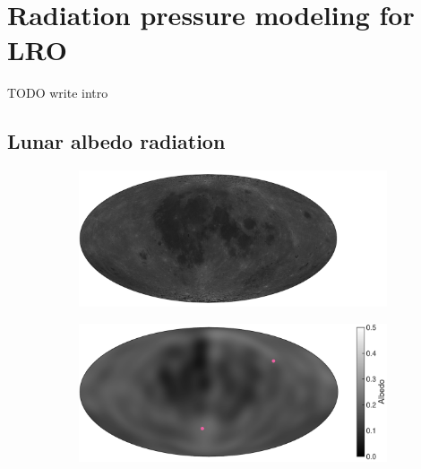 \section{Radiation pressure modeling for LRO}

TODO write intro

\subsection{Lunar albedo radiation}
\label{subsec:lunar-albedo}

\begin{figure}[t]
    \centering

    \begin{subfigure}[c]{0.49\textwidth}
        \includegraphics[width=\textwidth]{figures/plots/lunar_map_photo.pdf}
    \end{subfigure}
    \hfill
    \begin{subfigure}[c]{0.49\textwidth}
        \includegraphics[width=\textwidth]{figures/plots/lunar_map_dlam1.pdf}
    \end{subfigure}
    
    \bigskip
    

\end{figure}
